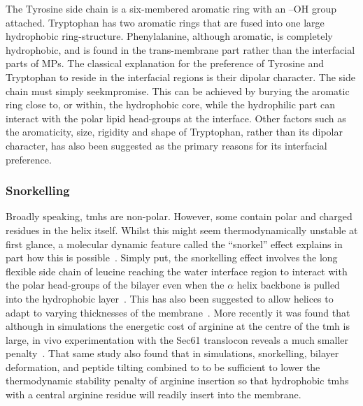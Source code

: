 The Tyrosine side chain is a six-membered aromatic ring with an –OH group attached.
Tryptophan has two aromatic rings that are fused into one large hydrophobic ring-structure.
Phenylalanine, although aromatic, is completely hydrophobic, and is found in the trans-membrane part rather than the interfacial parts of MPs.
The classical explanation for the preference of Tyrosine and Tryptophan to reside in the interfacial regions is their dipolar character.
The side chain must simply seekmpromise.
This can be achieved by burying the aromatic ring close to, or within, the hydrophobic core, while the hydrophilic part can interact with the polar lipid head-groups at the interface.
Other factors such as the aromaticity, size, rigidity and shape of Tryptophan, rather than its dipolar character, has also been suggested as the primary reasons for its interfacial preference.

\subsubsection{Snorkelling}

Broadly speaking, \gls{tmh}s are non-polar.
However, some contain polar and charged residues in the helix itself.
Whilst this might seem thermodynamically unstable at first glance, a molecular dynamic feature called the ``snorkel'' effect explains in part how this is possible~\cite{Chamberlain2004, Strandberg2003}.
Simply put, the snorkelling effect involves the long flexible side chain of leucine reaching the water interface region to interact with the polar head-groups of the bilayer even when the $\alpha$ helix backbone is pulled into the hydrophobic layer~\cite{Krishnakumar2007}.
This has also been suggested to allow helices to adapt to varying thicknesses of the membrane~\cite{Kandasamy2006}.
More recently it was found that although in simulations the energetic cost of arginine at the centre of the \gls{tmh} is large, in vivo experimentation with the Sec61 translocon reveals a much smaller penalty~\cite{Ulmschneider2017}.
That same study also found that in simulations, snorkelling, bilayer deformation, and peptide tilting combined to to be sufficient to lower the thermodynamic stability penalty of arginine insertion so that hydrophobic \gls{tmh}s with a central arginine residue will readily insert into the membrane.


